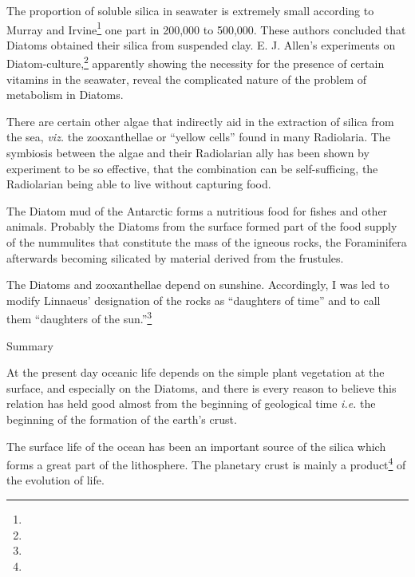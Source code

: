 \documentclass[a4paper, 12pt, oneside]{article}
\begin{document}
The proportion of soluble silica in seawater is extremely small according to Murray and Irvine\footnote{} one part in 200,000 to 500,000. These authors concluded that Diatoms obtained their silica from suspended clay. E. J. Allen's experiments on Diatom-culture,\footnote{} apparently showing the necessity for the presence of certain vitamins in the seawater, reveal the complicated nature of the problem of metabolism in Diatoms.

There are certain other algae that indirectly aid in the extraction of silica from the sea, \emph{viz.} the zooxanthellae or ``yellow cells'' found in many Radiolaria. The symbiosis between the algae and their Radiolarian ally has been shown by experiment to be so effective, that the combination can be self-sufficing, the Radiolarian being able to live without capturing food.

The Diatom mud of the Antarctic forms a nutritious food for fishes and other animals. Probably the Diatoms from the surface formed part of the food supply of the nummulites that constitute the mass of the igneous rocks, the Foraminifera afterwards becoming silicated by material derived from the frustules.

The Diatoms and zooxanthellae depend on sunshine. Accordingly, I was led to modify Linnaeus' designation of the rocks as ``daughters of time'' and to call them ``daughters of the sun.''\footnote{}

\bigskip
\centerline{Summary} 

At the present day oceanic life depends on the simple plant vegetation at the surface, and especially on the Diatoms, and there is every reason to believe this relation has held good almost from the beginning of geological time \emph{i.e.} the beginning of the formation of the earth's crust.

The surface life of the ocean has been an important source of the silica which forms a great part of the lithosphere. The planetary crust is mainly a product\footnote{} of the evolution of life.
\end{document}
